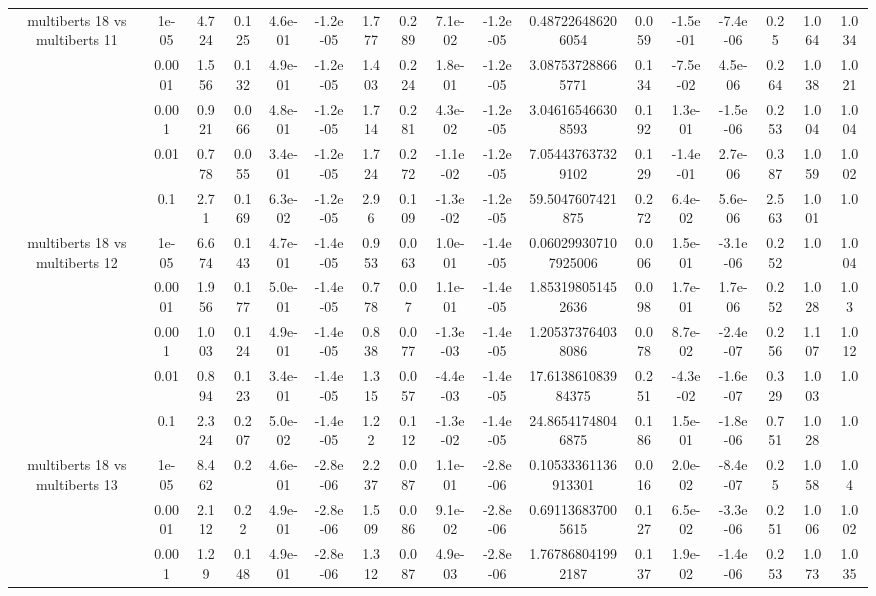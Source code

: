 \begin{tabular}{|c|c|c|c|c|c|c|c|c|c|c|c|c|c|c|c|c|}
\hline
\multirow{5}{*}{multiberts 18 vs multiberts 11} & 1e-05 & 4.724 & 0.125 & 4.6e-01 & -1.2e-05 & 1.777 & 0.289 & 7.1e-02 & -1.2e-05 & 0.487226486206054 & 0.059 & -1.5e-01 & -7.4e-06 & 0.25 & 1.064 & 1.034 \\
 & 0.0001 & 1.556 & 0.132 & 4.9e-01 & -1.2e-05 & 1.403 & 0.224 & 1.8e-01 & -1.2e-05 & 3.087537288665771 & 0.134 & -7.5e-02 & 4.5e-06 & 0.264 & 1.038 & 1.021 \\
 & 0.001 & 0.921 & 0.066 & 4.8e-01 & -1.2e-05 & 1.714 & 0.281 & 4.3e-02 & -1.2e-05 & 3.046165466308593 & 0.192 & 1.3e-01 & -1.5e-06 & 0.253 & 1.004 & 1.004 \\
 & 0.01 & 0.778 & 0.055 & 3.4e-01 & -1.2e-05 & 1.724 & 0.272 & -1.1e-02 & -1.2e-05 & 7.054437637329102 & 0.129 & -1.4e-01 & 2.7e-06 & 0.387 & 1.059 & 1.002 \\
 & 0.1 & 2.71 & 0.169 & 6.3e-02 & -1.2e-05 & 2.96 & 0.109 & -1.3e-02 & -1.2e-05 & 59.5047607421875 & 0.272 & 6.4e-02 & 5.6e-06 & 2.563 & 1.001 & 1.0 \\
\hline
\multirow{5}{*}{multiberts 18 vs multiberts 12} & 1e-05 & 6.674 & 0.143 & 4.7e-01 & -1.4e-05 & 0.953 & 0.063 & 1.0e-01 & -1.4e-05 & 0.060299307107925006 & 0.006 & 1.5e-01 & -3.1e-06 & 0.252 & 1.0 & 1.004 \\
 & 0.0001 & 1.956 & 0.177 & 5.0e-01 & -1.4e-05 & 0.778 & 0.07 & 1.1e-01 & -1.4e-05 & 1.853198051452636 & 0.098 & 1.7e-01 & 1.7e-06 & 0.252 & 1.028 & 1.03 \\
 & 0.001 & 1.003 & 0.124 & 4.9e-01 & -1.4e-05 & 0.838 & 0.077 & -1.3e-03 & -1.4e-05 & 1.205373764038086 & 0.078 & 8.7e-02 & -2.4e-07 & 0.256 & 1.107 & 1.012 \\
 & 0.01 & 0.894 & 0.123 & 3.4e-01 & -1.4e-05 & 1.315 & 0.057 & -4.4e-03 & -1.4e-05 & 17.613861083984375 & 0.251 & -4.3e-02 & -1.6e-07 & 0.329 & 1.003 & 1.0 \\
 & 0.1 & 2.324 & 0.207 & 5.0e-02 & -1.4e-05 & 1.22 & 0.112 & -1.3e-02 & -1.4e-05 & 24.86541748046875 & 0.186 & 1.5e-01 & -1.8e-06 & 0.751 & 1.028 & 1.0 \\
\hline
\multirow{5}{*}{multiberts 18 vs multiberts 13} & 1e-05 & 8.462 & 0.2 & 4.6e-01 & -2.8e-06 & 2.237 & 0.087 & 1.1e-01 & -2.8e-06 & 0.10533361136913301 & 0.016 & 2.0e-02 & -8.4e-07 & 0.25 & 1.058 & 1.04 \\
 & 0.0001 & 2.112 & 0.22 & 4.9e-01 & -2.8e-06 & 1.509 & 0.086 & 9.1e-02 & -2.8e-06 & 0.691136837005615 & 0.127 & 6.5e-02 & -3.3e-06 & 0.251 & 1.006 & 1.002 \\
 & 0.001 & 1.29 & 0.148 & 4.9e-01 & -2.8e-06 & 1.312 & 0.087 & 4.9e-03 & -2.8e-06 & 1.767868041992187 & 0.137 & 1.9e-02 & -1.4e-06 & 0.253 & 1.073 & 1.035 \\

\end{tabular}
